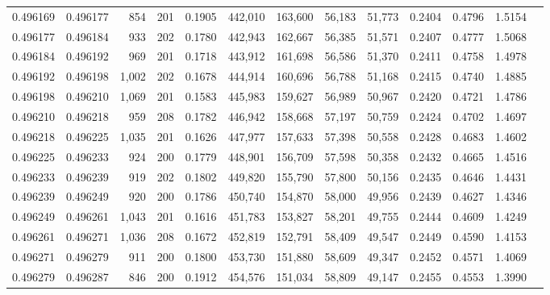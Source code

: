 \begin{tabular}{rrrrrrrrrrrrr}
0.496169 & 0.496177 &   854 & 201 &                                     0.1905 & 442,010 & 163,600 &  56,183 &  51,773 & 0.2404 & 0.4796 & 1.5154 \\
0.496177 & 0.496184 &   933 & 202 &                                     0.1780 & 442,943 & 162,667 &  56,385 &  51,571 & 0.2407 & 0.4777 & 1.5068 \\
0.496184 & 0.496192 &   969 & 201 &                                     0.1718 & 443,912 & 161,698 &  56,586 &  51,370 & 0.2411 & 0.4758 & 1.4978 \\
0.496192 & 0.496198 & 1,002 & 202 &                                     0.1678 & 444,914 & 160,696 &  56,788 &  51,168 & 0.2415 & 0.4740 & 1.4885 \\
0.496198 & 0.496210 & 1,069 & 201 &                                     0.1583 & 445,983 & 159,627 &  56,989 &  50,967 & 0.2420 & 0.4721 & 1.4786 \\
0.496210 & 0.496218 &   959 & 208 &                                     0.1782 & 446,942 & 158,668 &  57,197 &  50,759 & 0.2424 & 0.4702 & 1.4697 \\
0.496218 & 0.496225 & 1,035 & 201 &                                     0.1626 & 447,977 & 157,633 &  57,398 &  50,558 & 0.2428 & 0.4683 & 1.4602 \\
0.496225 & 0.496233 &   924 & 200 &                                     0.1779 & 448,901 & 156,709 &  57,598 &  50,358 & 0.2432 & 0.4665 & 1.4516 \\
0.496233 & 0.496239 &   919 & 202 &                                     0.1802 & 449,820 & 155,790 &  57,800 &  50,156 & 0.2435 & 0.4646 & 1.4431 \\
0.496239 & 0.496249 &   920 & 200 &                                     0.1786 & 450,740 & 154,870 &  58,000 &  49,956 & 0.2439 & 0.4627 & 1.4346 \\
0.496249 & 0.496261 & 1,043 & 201 &                                     0.1616 & 451,783 & 153,827 &  58,201 &  49,755 & 0.2444 & 0.4609 & 1.4249 \\
0.496261 & 0.496271 & 1,036 & 208 &                                     0.1672 & 452,819 & 152,791 &  58,409 &  49,547 & 0.2449 & 0.4590 & 1.4153 \\
0.496271 & 0.496279 &   911 & 200 &                                     0.1800 & 453,730 & 151,880 &  58,609 &  49,347 & 0.2452 & 0.4571 & 1.4069 \\
0.496279 & 0.496287 &   846 & 200 &                                     0.1912 & 454,576 & 151,034 &  58,809 &  49,147 & 0.2455 & 0.4553 & 1.3990 \\

\end{tabular}
